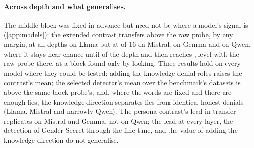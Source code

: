 \paragraph{Across depth and what generalises.} The middle block was fixed in advance but need not be
where a model's signal is (\cref{app:models}): the extended contrast transfers above the raw probe, by any
margin, at all  depths on Llama but at  of 16 on Mistral,
 on Gemma and  on Qwen, where it stays near chance until
 of the depth and then reaches , level with the raw probe
there, at a block found only by looking. Three results hold on every model where they could be tested:
adding the knowledge-denial roles raises the contrast's mean; the selected detector's mean over the
benchmark's datasets is above the same-block probe's; and, where the words are fixed and there are enough
lies, the knowledge direction separates lies from identical honest denials (Llama, Mistral and narrowly
Qwen). The persona contrast's lead in transfer replicates on Mistral and Gemma, not on Qwen; the lead at
every layer, the detection of Gender-Secret through the fine-tune, and the value of adding the knowledge
direction do not generalise.
